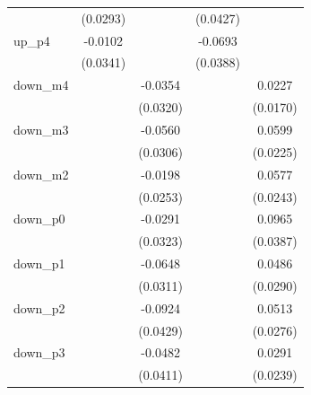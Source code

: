 \begin{table}[htbp]
\begin{tabular}{l*{4}{c}}
                    &    (0.0293)         &                     &    (0.0427)         &                     \\
[0.15em]
up\_p4               &     -0.0102         &                     &     -0.0693\sym{*}  &                     \\
                    &    (0.0341)         &                     &    (0.0388)         &                     \\
[0.15em]
down\_m4             &                     &     -0.0354         &                     &      0.0227         \\
                    &                     &    (0.0320)         &                     &    (0.0170)         \\
[0.15em]
down\_m3             &                     &     -0.0560\sym{*}  &                     &      0.0599\sym{***}\\
                    &                     &    (0.0306)         &                     &    (0.0225)         \\
[0.15em]
down\_m2             &                     &     -0.0198         &                     &      0.0577\sym{**} \\
                    &                     &    (0.0253)         &                     &    (0.0243)         \\
[0.15em]
down\_p0             &                     &     -0.0291         &                     &      0.0965\sym{**} \\
                    &                     &    (0.0323)         &                     &    (0.0387)         \\
[0.15em]
down\_p1             &                     &     -0.0648\sym{**} &                     &      0.0486\sym{*}  \\
                    &                     &    (0.0311)         &                     &    (0.0290)         \\
[0.15em]
down\_p2             &                     &     -0.0924\sym{**} &                     &      0.0513\sym{*}  \\
                    &                     &    (0.0429)         &                     &    (0.0276)         \\
[0.15em]
down\_p3             &                     &     -0.0482         &                     &      0.0291         \\
                    &                     &    (0.0411)         &                     &    (0.0239)         \\

\end{tabular}
\end{table}
